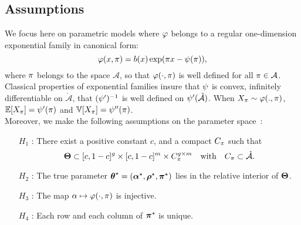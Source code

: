 \documentclass[bj]{imsart}
\numberwithin{equation}{section}
\theoremstyle{plain}
\theoremstyle{remark}
\newtheorem{rem}[thm]{Remark}
\begin{document}
\subsection{Assumptions}\label{sec:assumptions}
We focus here on parametric models where $\varphi$ belongs to a regular one-dimension exponential family in canonical form:
\begin{equation}
  \dens(x, \al) = b(x)\exp(\al x - \norm(\al)),
\end{equation}
where $\pi$ belongs to the space  $\mathcal{A}$, so that $\varphi(\cdot, \pi)$ is well defined for all $\pi \in \mathcal{A}$. Classical properties of exponential families insure that $\psi$ is convex, infinitely differentiable on $\mathring{\mathcal{A}}$, that $(\psi')^{-1}$ is well defined on $\psi'(\mathring{\mathcal{A}})$. When $X_{\pi} \sim \varphi(., \pi)$, $\mathbb{E}[X_\pi] = \psi'(\pi)$ and $\mathbb{V}[X_{\pi}] = \psi''(\pi)$. \\

Moreover, we make the following assumptions on the parameter space~:
\begin{enumerate}
\item[$H_1$]: There exist a positive constant $c$, and a compact $C_\pi$ such that 
  \begin{equation*}
    \bTheta \subset [c, 1-c]^{\g} \times  [c, 1-c]^{\m} \times C_{\al}^{\g \times \m} \quad \text{with} \quad C_\al \subset \mathring{\mathcal{A}}.
  \end{equation*}
\item[$H_2$]: The true parameter $\boldsymbol{\theta}^\star = (\boldsymbol{\alpha}^\star, \boldsymbol{\rho}^\star, \boldsymbol{\pi}^\star)$ lies in the relative interior of $\boldsymbol{\Theta}$.
\item[$H_3$]: The map $\alpha \mapsto \varphi(\cdot, \pi)$ is injective.
\item[$H_4$]: 
Each row and each column of $\boldsymbol{\pi}^\star$ is unique.
\end{enumerate}
\end{document}
